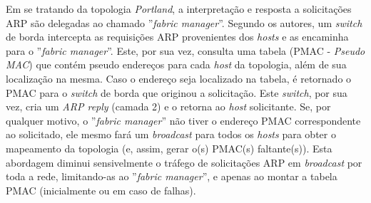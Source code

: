 \documentclass[12pt,twoside,a4paper]{article}
\begin{document}
Em se tratando da topologia \textit{Portland}, a interpretação e resposta a solicitações ARP são delegadas ao chamado ''\textit{fabric manager}''. Segundo os autores, um \textit{switch} de borda intercepta as requisições ARP provenientes dos \textit{hosts} e as encaminha para o ''\textit{fabric manager}''. Este, por sua vez, consulta uma tabela (PMAC - \textit{Pseudo MAC}) que contém pseudo endereços para cada \textit{host} da topologia, além de sua localização na mesma.
Caso o endereço seja localizado na tabela, é retornado o PMAC para o \textit{switch} de borda que originou a solicitação. Este \textit{switch}, por sua vez, cria um \textit{ARP reply} (camada 2) e o retorna ao \textit{host} solicitante.
Se, por qualquer motivo,  o ''\textit{fabric manager}'' não tiver o endereço PMAC correspondente ao solicitado, ele mesmo fará um \textit{broadcast} para todos os \textit{hosts} para obter o mapeamento da topologia (e, assim, gerar o(s) PMAC(s) faltante(s)).
Esta abordagem diminui sensivelmente o tráfego de solicitações ARP em \textit{broadcast} por toda a rede, limitando-as ao ''\textit{fabric manager}'', e apenas ao montar a tabela PMAC (inicialmente ou em caso de falhas)\cite{NiranjanMysore:2009:PSF:1594977.1592575}.




\end{document}
